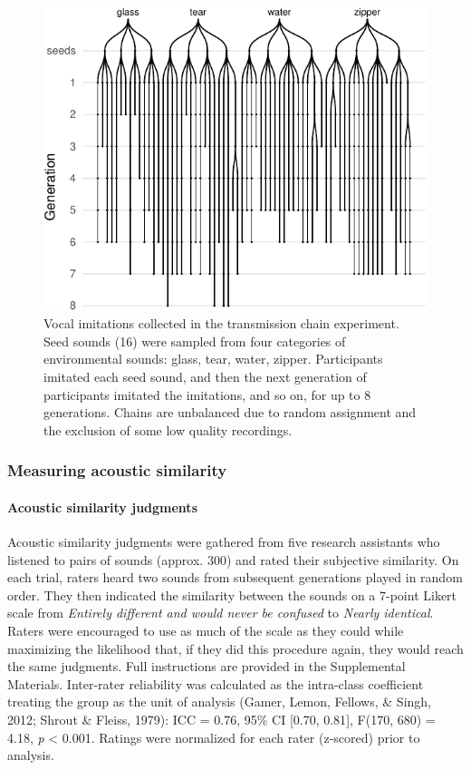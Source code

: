 \documentclass[english,floatsintext,man]{apa6}
\theoremstyle{definition}
\theoremstyle{definition}
\theoremstyle{definition}
\theoremstyle{remark}
\begin{document}
\begin{figure}
\centering
\includegraphics{fig1-1.pdf}
\caption{\label{fig:fig1}Vocal imitations collected in the transmission
chain experiment. Seed sounds (16) were sampled from four categories of
environmental sounds: glass, tear, water, zipper. Participants imitated
each seed sound, and then the next generation of participants imitated
the imitations, and so on, for up to 8 generations. Chains are
unbalanced due to random assignment and the exclusion of some low
quality recordings.}
\end{figure}

\hypertarget{measuring-acoustic-similarity}{%
\subsubsection{Measuring acoustic
similarity}\label{measuring-acoustic-similarity}}

\hypertarget{acoustic-similarity-judgments}{%
\paragraph{Acoustic similarity
judgments}\label{acoustic-similarity-judgments}}

Acoustic similarity judgments were gathered from five research
assistants who listened to pairs of sounds (approx. 300) and rated their
subjective similarity. On each trial, raters heard two sounds from
subsequent generations played in random order. They then indicated the
similarity between the sounds on a 7-point Likert scale from
\emph{Entirely different and would never be confused} to \emph{Nearly
identical}. Raters were encouraged to use as much of the scale as they
could while maximizing the likelihood that, if they did this procedure
again, they would reach the same judgments. Full instructions are
provided in the Supplemental Materials. Inter-rater reliability was
calculated as the intra-class coefficient treating the group as the unit
of analysis (Gamer, Lemon, Fellows, \& Singh, 2012; Shrout \& Fleiss,
1979): ICC = 0.76, 95\% CI {[}0.70, 0.81{]}, F(170, 680) = 4.18,
\emph{p} \textless{} 0.001. Ratings were normalized for each rater
(z-scored) prior to analysis.
\end{document}
